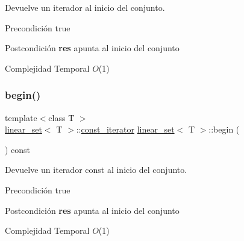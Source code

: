 Devuelve un iterador al inicio del conjunto. 

\begin{DoxyPrecond}{Precondición}
true 
\end{DoxyPrecond}
\begin{DoxyPostcond}{Postcondición}
{\bfseries res} apunta al inicio del conjunto
\end{DoxyPostcond}

\begin{DoxyDescription}
\item[Complejidad Temporal]$O$(1)
\end{DoxyDescription}\mbox{\label{classlinear__set_ab75a525c9d40b5dc9c301c47095b0f9f}} 
\subsubsection{\texorpdfstring{begin()}{begin()}\hspace{0.1cm}{\footnotesize\ttfamily [2/2]}}
{\footnotesize\ttfamily template$<$class T $>$ \\
\mbox{\hyperlink{classlinear__set}{linear\+\_\+set}}$<$ T $>$\+::\mbox{\hyperlink{classlinear__set_1_1const__iterator}{const\+\_\+iterator}} \mbox{\hyperlink{classlinear__set}{linear\+\_\+set}}$<$ T $>$\+::begin (\begin{DoxyParamCaption}{ }\end{DoxyParamCaption}) const}



Devuelve un iterador const al inicio del conjunto. 

\begin{DoxyPrecond}{Precondición}
true 
\end{DoxyPrecond}
\begin{DoxyPostcond}{Postcondición}
{\bfseries res} apunta al inicio del conjunto
\end{DoxyPostcond}

\begin{DoxyDescription}
\item[Complejidad Temporal]$O$(1)
\end{DoxyDescription}\mbox{\label{classlinear__set_a5f61fef1dce039b252941854b6eddbfe}} 
